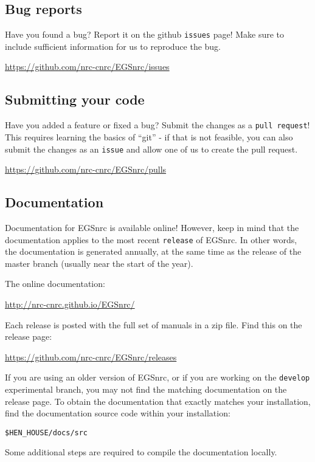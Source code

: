 \documentclass[12pt,twoside]{article}
\begin{document}
\subsection{Bug reports}
Have you found a bug? Report it on the github \Verb+issues+ page! Make sure to include sufficient information for us to reproduce the bug.

\href{https://github.com/nrc-cnrc/EGSnrc/issues}{https://github.com/nrc-cnrc/EGSnrc/issues}

\subsection{Submitting your code}
Have you added a feature or fixed a bug? Submit the changes as a \Verb+pull request+! This requires learning the basics of ``git'' - if that is not feasible, you can also submit the changes as an \Verb+issue+ and allow one of us to create the pull request.

\href{https://github.com/nrc-cnrc/EGSnrc/pulls}{https://github.com/nrc-cnrc/EGSnrc/pulls}

\subsection{Documentation}
Documentation for EGSnrc is available online! However, keep in mind
that the documentation applies to the most recent \Verb+release+ of EGSnrc.
In other words, the documentation is generated annually, at the same time as the
release of the master branch (usually near the start of the year).

The online documentation:

\href{http://nrc-cnrc.github.io/EGSnrc/}{http://nrc-cnrc.github.io/EGSnrc/}

Each release is posted with the full set of manuals in a zip file. Find this on the release page:

\href{https://github.com/nrc-cnrc/EGSnrc/releases}{https://github.com/nrc-cnrc/EGSnrc/releases}

If you are using an older version of EGSnrc, or if you are working on the
\Verb+develop+ experimental branch, you may not find the matching documentation on the release page. To obtain the documentation that exactly matches your installation, find the documentation source code within your installation:

\Verb+$HEN_HOUSE/docs/src+

Some additional steps are required to compile the documentation locally.
\end{document}
